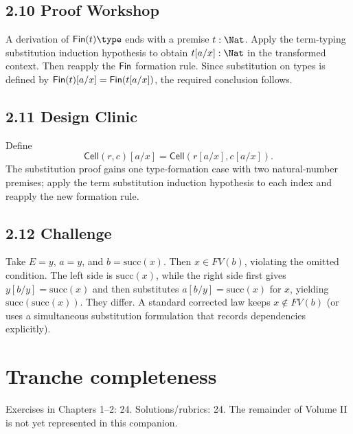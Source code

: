 \documentclass[11pt,openany]{book}
\begin{document}
\section*{2.10 Proof Workshop}
A derivation of $\Fin(t)\type$ ends with a premise $t:\Nat$. Apply the term-typing substitution induction hypothesis to obtain $t[a/x]:\Nat$ in the transformed context. Then reapply the $\mathsf{Fin}$ formation rule. Since substitution on types is defined by $\mathsf{Fin}(t)[a/x]=\mathsf{Fin}(t[a/x])$, the required conclusion follows.

\section*{2.11 Design Clinic}
Define
\[
 \mathsf{Cell}(r,c)[a/x]
 = \mathsf{Cell}(r[a/x],c[a/x]).
\]
The substitution proof gains one type-formation case with two natural-number premises; apply the term substitution induction hypothesis to each index and reapply the new formation rule.

\section*{2.12 Challenge}
Take $E=y$, $a=y$, and $b=\mathrm{succ}(x)$. Then $x\in FV(b)$, violating the omitted condition. The left side is $\mathrm{succ}(x)$, while the right side first gives $y[b/y]=\mathrm{succ}(x)$ and then substitutes $a[b/y]=\mathrm{succ}(x)$ for $x$, yielding $\mathrm{succ}(\mathrm{succ}(x))$. They differ. A standard corrected law keeps $x\notin FV(b)$ (or uses a simultaneous substitution formulation that records dependencies explicitly).

\backmatter
\chapter*{Tranche completeness}
Exercises in Chapters 1–2: 24. Solutions/rubrics: 24. The remainder of Volume II is not yet represented in this companion.
\end{document}
